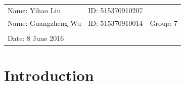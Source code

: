\documentclass{article}
\begin{document}
\vspace*{0.25cm}

\hrulefill

\thispagestyle{empty}

\begin{center}
\begin{large}
\end{large}

\hrulefill

\vspace*{5cm}
\begin{Large}
\end{Large}

\vspace{2em}

\begin{large}
\end{large}
\end{center}


\vfill

\begin{table}[h!]
\flushleft
\begin{tabular}{lll}
Name: Yihao Liu \hspace*{2em}&
ID: 515370910207\hspace*{2em}\\
Name: Guangzheng Wu \hspace*{2em}&
ID: 515370910014\hspace*{2em}
& Group: 7\\


\\

Date: 8 June 2016 

\end{tabular}
\end{table}

\hfill
\begin{tiny}
[rev. 1.0]
\end{tiny}
\newpage

\section{Introduction}
\end{document}
